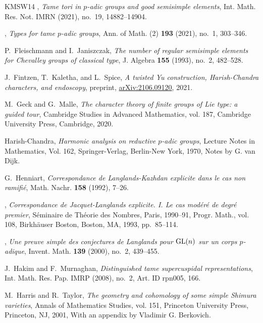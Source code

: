 \documentclass{amsart}
\theoremstyle{plain}
\theoremstyle{definition}
\theoremstyle{remark}
\theoremstyle{theorem}
\begin{document}
\begin{thebibliography}{KMSW14}
\bysame, \emph{Tame tori in {$p$}-adic groups and good semisimple elements},
  Int. Math. Res. Not. IMRN (2021), no.~19, 14882--14904.

\bysame, \emph{Types for tame {$p$}-adic groups}, Ann. of Math. (2)
  \textbf{193} (2021), no.~1, 303--346.

P.~Fleischmann and I.~Janiszczak, \emph{The number of regular semisimple
  elements for {C}hevalley groups of classical type}, J. Algebra \textbf{155}
  (1993), no.~2, 482--528.

J.~Fintzen, T.~Kaletha, and L.~Spice, \emph{A twisted {Y}u construction,
  {H}arish-{C}handra characters, and endoscopy}, preprint,
  \url{arXiv:2106.09120}, 2021.

M.~Geck and G.~Malle, \emph{The character theory of finite groups of {L}ie
  type: a guided tour}, Cambridge Studies in Advanced Mathematics, vol. 187,
  Cambridge University Press, Cambridge, 2020.

Harish-Chandra, \emph{Harmonic analysis on reductive {$p$}-adic groups},
  Lecture Notes in Mathematics, Vol. 162, Springer-Verlag, Berlin-New York,
  1970, Notes by G. van Dijk.

G.~Henniart, \emph{Correspondance de {L}anglands-{K}azhdan explicite dans le
  cas non ramifi\'{e}}, Math. Nachr. \textbf{158} (1992), 7--26.

\bysame, \emph{Correspondance de {J}acquet-{L}anglands explicite. {I}. {L}e cas
  mod\'{e}r\'{e} de degr\'{e} premier}, S\'{e}minaire de {T}h\'{e}orie des
  {N}ombres, {P}aris, 1990--91, Progr. Math., vol. 108, Birkh\"{a}user Boston,
  Boston, MA, 1993, pp.~85--114.

\bysame, \emph{Une preuve simple des conjectures de {L}anglands pour {${\rm
  GL}(n)$} sur un corps {$p$}-adique}, Invent. Math. \textbf{139} (2000),
  no.~2, 439--455.

J.~Hakim and F.~Murnaghan, \emph{Distinguished tame supercuspidal
  representations}, Int. Math. Res. Pap. IMRP (2008), no.~2, Art. ID rpn005,
  166.

M.~Harris and R.~Taylor, \emph{The geometry and cohomology of some simple
  {S}himura varieties}, Annals of Mathematics Studies, vol. 151, Princeton
  University Press, Princeton, NJ, 2001, With an appendix by Vladimir G.
  Berkovich.


\end{thebibliography}
\end{document}

